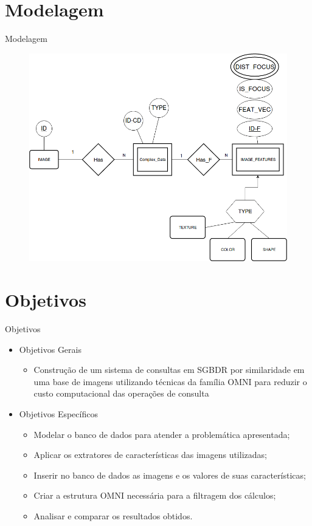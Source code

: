 \documentclass{beamer}
\begin{document}
\section{Modelagem}
\begin{frame}{Modelagem}
    	\begin{figure}[H]
			\centering
			\includegraphics[width=.8\textwidth]{MER.png}
	\end{figure}

\end{frame}

\section{Objetivos}

\begin{frame}{Objetivos}
  \begin{itemize}
   \item Objetivos Gerais
   \begin{itemize}
      \item Construção de um sistema de consultas em SGBDR por similaridade em uma base de imagens utilizando técnicas da família OMNI para reduzir o custo computacional das operações de consulta\newline
   \end{itemize}
   \item Objetivos Específicos
   \begin{itemize}
      \item Modelar o banco de dados para atender a problemática apresentada;
      \item Aplicar os extratores de características das imagens utilizadas;
      \item Inserir no banco de dados as imagens e os valores de suas características;
      \item Criar a estrutura OMNI necessária para a filtragem dos cálculos;
      \item Analisar e comparar os resultados obtidos.
   \end{itemize}
   
  \end{itemize}

\end{frame}
\end{document}
